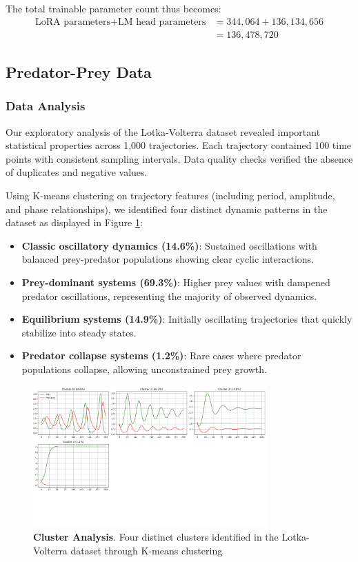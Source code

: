 \documentclass{article}
\begin{document}
The total trainable parameter count thus becomes:
\begin{align}
\text{LoRA parameters} + \text{LM head parameters} &= 344,064 + 136,134,656\\
&= 136,478,720
\end{align}

\subsection*{Predator-Prey Data}

\subsubsection*{Data Analysis}

Our exploratory analysis of the Lotka-Volterra dataset revealed important statistical properties across 1,000 trajectories. Each trajectory contained 100 time points with consistent sampling intervals. Data quality checks verified the absence of duplicates and negative values. 

Using K-means clustering on trajectory features (including period, amplitude, and phase relationships), we identified four distinct dynamic patterns in the dataset as displayed in Figure \ref{fig:clusters}:

\begin{itemize}
    \item \textbf{Classic oscillatory dynamics (14.6\%)}: Sustained oscillations with balanced prey-predator populations showing clear cyclic interactions.
    \item \textbf{Prey-dominant systems (69.3\%)}: Higher prey values with dampened predator oscillations, representing the majority of observed dynamics.
    \item \textbf{Equilibrium systems (14.9\%)}: Initially oscillating trajectories that quickly stabilize into steady states.
    \item \textbf{Predator collapse systems (1.2\%)}: Rare cases where predator populations collapse, allowing unconstrained prey growth.
    \end{itemize}

\begin{figure}[H]
    \centering
    \includegraphics[width=0.8\textwidth]{cluster_representatives}
    \caption{\textbf{Cluster Analysis}. Four distinct clusters identified in the Lotka-Volterra dataset through K-means clustering}
    \label{fig:clusters}
\end{figure}
\end{document}
